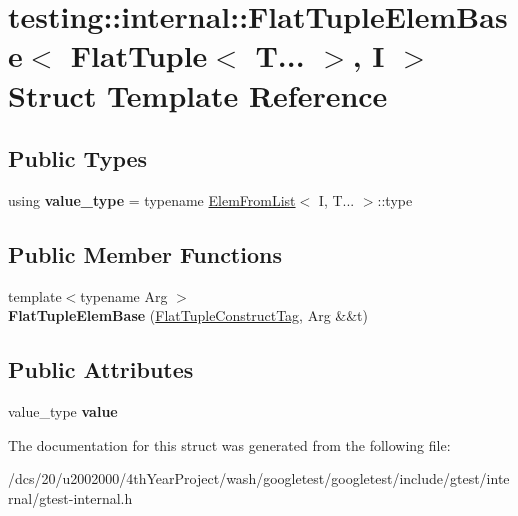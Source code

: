 \hypertarget{structtesting_1_1internal_1_1FlatTupleElemBase_3_01FlatTuple_3_01T_8_8_8_01_4_00_01I_01_4}{}\section{testing\+:\+:internal\+:\+:Flat\+Tuple\+Elem\+Base$<$ Flat\+Tuple$<$ T... $>$, I $>$ Struct Template Reference}
\label{structtesting_1_1internal_1_1FlatTupleElemBase_3_01FlatTuple_3_01T_8_8_8_01_4_00_01I_01_4}
\subsection*{Public Types}
\begin{DoxyCompactItemize}
\item 
\mbox{\label{structtesting_1_1internal_1_1FlatTupleElemBase_3_01FlatTuple_3_01T_8_8_8_01_4_00_01I_01_4_ac0be5571ecb617d8218f67a6fbfe9c30}} 
using {\bfseries value\+\_\+type} = typename \mbox{\hyperlink{structtesting_1_1internal_1_1ElemFromList}{Elem\+From\+List}}$<$ I, T... $>$\+::type
\end{DoxyCompactItemize}
\subsection*{Public Member Functions}
\begin{DoxyCompactItemize}
\item 
\mbox{\label{structtesting_1_1internal_1_1FlatTupleElemBase_3_01FlatTuple_3_01T_8_8_8_01_4_00_01I_01_4_a929800f64f800bbd6d18dab0bf84e467}} 
{\footnotesize template$<$typename Arg $>$ }\\{\bfseries Flat\+Tuple\+Elem\+Base} (\mbox{\hyperlink{structtesting_1_1internal_1_1FlatTupleConstructTag}{Flat\+Tuple\+Construct\+Tag}}, Arg \&\&t)
\end{DoxyCompactItemize}
\subsection*{Public Attributes}
\begin{DoxyCompactItemize}
\item 
\mbox{\label{structtesting_1_1internal_1_1FlatTupleElemBase_3_01FlatTuple_3_01T_8_8_8_01_4_00_01I_01_4_ac175518e7807c0b49c0ba8c1c78269ec}} 
value\+\_\+type {\bfseries value}
\end{DoxyCompactItemize}


The documentation for this struct was generated from the following file\+:\begin{DoxyCompactItemize}
\item 
/dcs/20/u2002000/4th\+Year\+Project/wash/googletest/googletest/include/gtest/internal/gtest-\/internal.\+h\end{DoxyCompactItemize}
